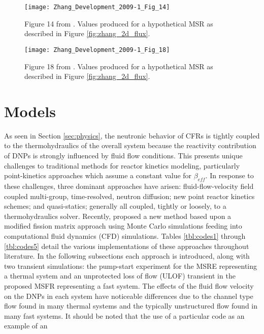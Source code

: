 \documentclass[review]{elsarticle}
\begin{document}
\begin{figure}[H]
   \centering
   \texttt{[image: Zhang\_Development\_2009-1\_Fig\_14]}
   \caption{Figure 14 from \cite{zhang_development_2009-1}. Values produced for a hypothetical
   MSR as described in Figure \ref{fig:zhang_2d_flux}.}
   \label{fig:zhang_velocity_keff}
\end{figure}

\begin{figure}[H]
   \centering
   \texttt{[image: Zhang\_Development\_2009-1\_Fig\_18]}
   \caption{Figure 18 from \cite{zhang_development_2009-1}. Values produced for a hypothetical MSR
   as described in Figure \ref{fig:zhang_2d_flux}.} 
   \label{fig:zhang_residence_time_keff}
\end{figure}

\section{Models} \label{sec:models}
As seen in Section \ref{sec:physics}, the neutronic behavior of CFRs is tightly
coupled to the thermohydraulics of the overall system because the reactivity 
contribution of DNPs is strongly influenced by fluid flow conditions.
This presents unique
challenges to traditional methods for reactor kinetics modeling, particularly
point-kinetics approaches which assume a constant value for $\beta_{eff}$. In
response to these challenges, three dominant approaches have arisen: 
fluid-flow-velocity field coupled multi-group, time-resolved, neutron diffusion;
new point reactor kinetics schemes; and quasi-statics; generally all coupled, tightly
or loosely, to a thermohydraulics solver. Recently,
\cite{laureau_coupled_2015} proposed a new method based upon a modified
fission matrix approach using Monte Carlo simulations feeding into
computational fluid dynamics (CFD) simulations. Tables \ref{tbl:codes1}
through \ref{tbl:codes5} detail
the various implementations of these approaches throughout literature.
In the following subsections
each approach is introduced, along with two transient simulations: the pump-start
experiment for the MSRE representing a thermal system and an unprotected loss
of flow (ULOF) transient in the proposed MSFR representing a fast system. 
The effects of the fluid flow velocity on the DNPs in each
system have noticeable differences due to the channel type flow found in many
thermal systems and the typically unstructured flow found in many fast
systems.
It should be noted that the use of a particular code as an example of an
\end{document}
